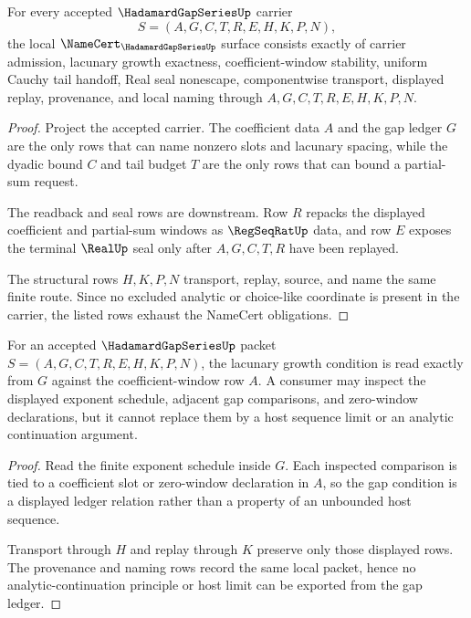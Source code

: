 \begin{theorem}
\label{thm:hadamard-gap-series-namecert-obligations}
For every accepted $\HadamardGapSeriesUp$ carrier
$$
S=(A,G,C,T,R,E,H,K,P,N),
$$
the local $\NameCert_{\HadamardGapSeriesUp}$ surface consists exactly of carrier admission, lacunary growth exactness, coefficient-window stability, uniform Cauchy tail handoff, Real seal nonescape, componentwise transport, displayed replay, provenance, and local naming through $A,G,C,T,R,E,H,K,P,N$.
\end{theorem}
\begin{proof}
Project the accepted carrier. The coefficient data $A$ and the gap ledger $G$ are the only rows that can name nonzero slots and lacunary spacing, while the dyadic bound $C$ and tail budget $T$ are the only rows that can bound a partial-sum request.

The readback and seal rows are downstream. Row $R$ repacks the displayed coefficient and partial-sum windows as $\RegSeqRatUp$ data, and row $E$ exposes the terminal $\RealUp$ seal only after $A,G,C,T,R$ have been replayed.

The structural rows $H,K,P,N$ transport, replay, source, and name the same finite route. Since no excluded analytic or choice-like coordinate is present in the carrier, the listed rows exhaust the NameCert obligations.
\end{proof}

\begin{theorem}
\label{thm:hadamard-gap-series-growth-exactness}
For an accepted $\HadamardGapSeriesUp$ packet $S=(A,G,C,T,R,E,H,K,P,N)$, the lacunary growth condition is read exactly from $G$ against the coefficient-window row $A$. A consumer may inspect the displayed exponent schedule, adjacent gap comparisons, and zero-window declarations, but it cannot replace them by a host sequence limit or an analytic continuation argument.
\end{theorem}
\begin{proof}
Read the finite exponent schedule inside $G$. Each inspected comparison is tied to a coefficient slot or zero-window declaration in $A$, so the gap condition is a displayed ledger relation rather than a property of an unbounded host sequence.

Transport through $H$ and replay through $K$ preserve only those displayed rows. The provenance and naming rows record the same local packet, hence no analytic-continuation principle or host limit can be exported from the gap ledger.
\end{proof}

